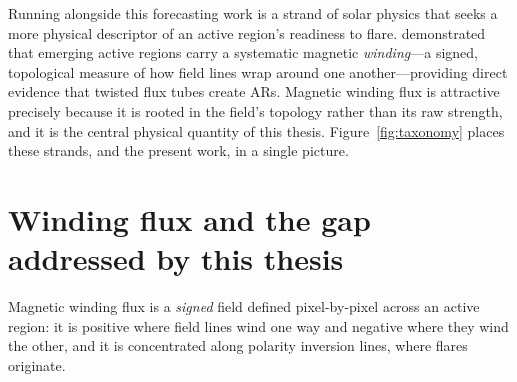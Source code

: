 Running alongside this forecasting work is a strand of solar physics that seeks
a more physical descriptor of an active region's readiness to flare.
\citet{mactaggart2021} demonstrated that emerging active regions carry a
systematic magnetic \emph{winding}---a signed, topological measure of how field
lines wrap around one another---providing direct evidence that twisted flux
tubes create ARs. Magnetic winding flux is attractive precisely because it is
rooted in the field's topology rather than its raw strength, and it is the
central physical quantity of this thesis. Figure~\ref{fig:taxonomy} places these
strands, and the present work, in a single picture.



\section{Winding flux and the gap addressed by this thesis}

Magnetic winding flux is a \emph{signed} field defined pixel-by-pixel across an
active region: it is positive where field lines wind one way and negative where
they wind the other, and it is concentrated along polarity inversion lines,
where flares originate.

